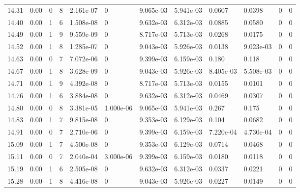\documentclass[preview]{standalone}
\begin{document}
{{{{{\begin{tabular}{L{1.2cm}C{1.2cm} C{0.3cm}C{0.5cm} C{1.4cm}C{1.4cm} C{1.4cm}C{1.4cm} C{1.6cm}C{1.6cm} C{1.6cm}C{1.6cm}}
  14.31  &  0.00  & 0     &  8 &  2.161e-07  & 0  &  9.065e-03&   5.941e-03& 0.0607 & 0.0398   &  0 & 0  \\ 
  14.40  &  0.00  & 1     &  6 &  1.508e-08  & 0  &  9.632e-03&   6.312e-03& 0.0885 & 0.0580   &  0 & 0  \\ 
  14.49  &  0.00  & 1     &  9 &  9.559e-09  & 0  &  8.717e-03&   5.713e-03& 0.0268 & 0.0175   &  0 & 0  \\ 
  14.52  &  0.00  & 1     &  8 &  1.285e-07  & 0  &  9.043e-03&   5.926e-03& 0.0138 & 9.023e-03   &  0 & 0  \\ 
  14.63  &  0.00  & 0     &  7 &  7.072e-06  & 0  &  9.399e-03&   6.159e-03& 0.180 & 0.118   &  0 & 0  \\ 
  14.67  &  0.00  & 1     &  8 &  3.628e-09  & 0  &  9.043e-03&   5.926e-03& 8.405e-03 & 5.508e-03   &  0 & 0  \\ 
  14.71  &  0.00  & 1     &  9 &  4.392e-08  & 0  &  8.717e-03&   5.713e-03& 0.0155 & 0.0101   &  0 & 0  \\ 
  14.76  &  0.00  & 1     &  6 &  3.884e-08  & 0  &  9.632e-03&   6.312e-03& 0.0469 & 0.0307   &  0 & 0  \\ 
  14.80  &  0.00  & 0     &  8 &  3.381e-05  & 1.000e-06  &  9.065e-03&   5.941e-03& 0.267 & 0.175   &  0 & 0  \\ 
  14.83  &  0.00  & 1     &  7 &  9.815e-08  & 0  &  9.353e-03&   6.129e-03& 0.104 & 0.0682   &  0 & 0  \\ 
  14.91  &  0.00  & 0     &  7 &  2.710e-06  & 0  &  9.399e-03&   6.159e-03& 7.220e-04 & 4.730e-04   &  0 & 0  \\ 
  15.09  &  0.00  & 1     &  7 &  4.500e-08  & 0  &  9.353e-03&   6.129e-03& 0.0714 & 0.0468   &  0 & 0  \\ 
  15.11  &  0.00  & 0     &  7 &  2.040e-04  & 3.000e-06  &  9.399e-03&   6.159e-03& 0.0180 & 0.0118   &  0 & 0  \\ 
  15.19  &  0.00  & 1     &  6 &  2.505e-08  & 0  &  9.632e-03&   6.312e-03& 0.0337 & 0.0221   &  0 & 0  \\ 
  15.28  &  0.00  & 1     &  8 &  4.416e-08  & 0  &  9.043e-03&   5.926e-03& 0.0227 & 0.0149   &  0 & 0  \\ 
\hline 
\end{tabular} 

}}}}}
\end{document}
